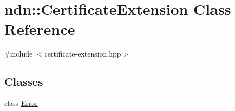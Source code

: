 \hypertarget{classndn_1_1CertificateExtension}{}\section{ndn\+:\+:Certificate\+Extension Class Reference}
\label{classndn_1_1CertificateExtension}


{\ttfamily \#include $<$certificate-\/extension.\+hpp$>$}

\subsection*{Classes}
\begin{DoxyCompactItemize}
\item 
class \hyperlink{classndn_1_1CertificateExtension_1_1Error}{Error}
\end{DoxyCompactItemize}
